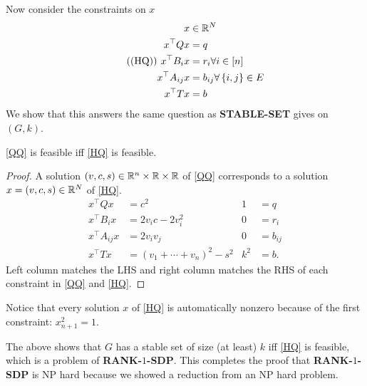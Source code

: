 Now consider the constraints on $x$ \begin{equation}\tag{(HQ)}\label{HQ}\begin{aligned}x&\in\mathbb{R}^{N}\\
x^{\top}Qx&=q\\
x^{\top}B_{i}x &= r_{i}\forall i\in[n]\\
x^{\top}A_{ij}x &= b_{ij}\forall \left\{i,j\right\}\in E \\
x^{\top}Tx &= b\end{aligned}\end{equation}
We show that this answers the same question as \textbf{STABLE-SET} gives on $(G,k)$.
\begin{cl}
\ref{QQ} is feasible iff \ref{HQ} is feasible.
\end{cl}
\begin{proof}
A solution $(v,c,s)\in \mathbb{R}^{n}\times \mathbb{R}\times\mathbb{R}$ of \ref{QQ} corresponds to a solution  $x=(v,c,s)\in \mathbb{R}^{N}$ of \ref{HQ}. \begin{align*}
x^{\top}Qx &= c^{2}  & 1 &= q\\
x^{\top}B_{i}x &= 2v_{i}c-2v_{i}^{2} &0 &=r_{i}\\
x^{\top}A_{ij}x &= 2v_{i}v_{j} & 0&=b_{ij}\\
x^{\top}Tx &= (v_{1}+\cdots+v_{n})^{2} - s^{2} & k^{2} &= b.
\end{align*}
Left column matches the LHS and right column matches the RHS of each constraint in \ref{QQ} and \ref{HQ}.
\end{proof}
Notice that every solution $x$ of \ref{HQ} is automatically nonzero because of the first constraint: $x_{n+1}^{2}=1$. 

The above shows that $G$ has a stable set of size (at least) $k$ iff \ref{HQ} is feasible, which is a problem of \textbf{RANK-$1$-SDP}. This completes the proof that \textbf{RANK-$1$-SDP} is NP hard because we showed a reduction from an NP hard problem.

